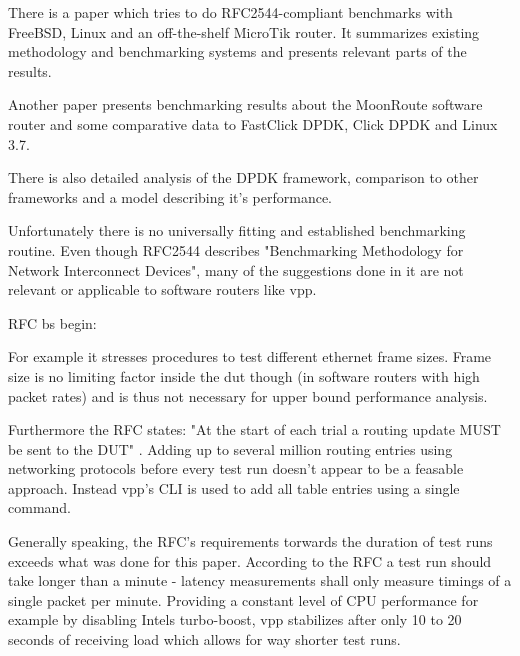 There is a paper \cite{revisiting-benchmarking:1} which tries to do
RFC2544-compliant benchmarks with FreeBSD, Linux and an off-the-shelf
MicroTik router. It summarizes existing methodology and benchmarking
systems and presents relevant parts of the results.

Another paper \cite{chair:architecture} presents benchmarking results
about the MoonRoute software router and some comparative data to
FastClick DPDK, Click DPDK and Linux 3.7.

There is also detailed analysis of the DPDK framework, comparison to
other frameworks and a model describing it's performance. \cite
{compare-highperf}


Unfortunately there is no universally fitting and established
benchmarking routine. Even though RFC2544 \cite{rfc2544} describes
"Benchmarking Methodology for Network Interconnect Devices", many of
the suggestions done in it are not relevant or applicable to software
routers like \Ac{vpp}. \cite{revisiting-benchmarking:1}

RFC bs begin: %


For example it stresses procedures to test different ethernet frame
sizes. Frame size is no limiting factor inside the \Ac{dut} though (in
software routers with high packet rates) and is thus not necessary for
upper bound performance analysis. \cite{emmerich2015assessing}


Furthermore the RFC states: "At the start of each trial a routing
update MUST be sent to the DUT" \cite{rfc2544}. Adding up to several
million routing entries using networking protocols before every test
run doesn't appear to be a feasable approach. Instead \Ac{vpp}'s CLI
is used to add all table entries using a single command.


Generally speaking, the RFC's requirements torwards the duration of
test runs exceeds what was done for this paper. According to the RFC a
test run should take longer than a minute - latency measurements shall
only measure timings of a single packet per minute. Providing a
constant level of CPU performance for example by disabling Intels
turbo-boost, \Ac{vpp} stabilizes after only 10 to 20 seconds of
receiving load which allows for way shorter test runs.

